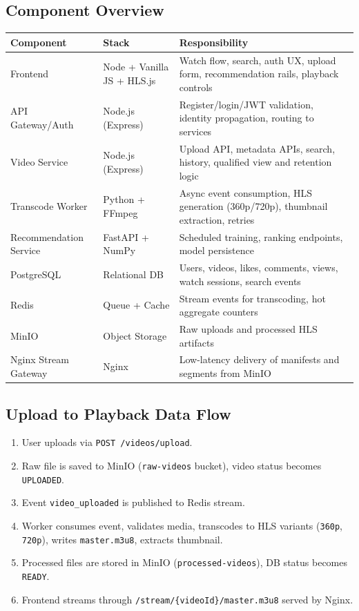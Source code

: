 \documentclass[11pt,a4paper]{article}
\begin{document}
\subsection{Component Overview}
\begin{table}[H]
\centering
\begin{tabularx}{\textwidth}{@{}p{3.0cm}p{2.3cm}X@{}}
\toprule
\textbf{Component} & \textbf{Stack} & \textbf{Responsibility} \\
\midrule
Frontend & Node + Vanilla JS + HLS.js & Watch flow, search, auth UX, upload form, recommendation rails, playback controls \\
API Gateway/Auth & Node.js (Express) & Register/login/JWT validation, identity propagation, routing to services \\
Video Service & Node.js (Express) & Upload API, metadata APIs, search, history, qualified view and retention logic \\
Transcode Worker & Python + FFmpeg & Async event consumption, HLS generation (360p/720p), thumbnail extraction, retries \\
Recommendation Service & FastAPI + NumPy & Scheduled training, ranking endpoints, model persistence \\
PostgreSQL & Relational DB & Users, videos, likes, comments, views, watch sessions, search events \\
Redis & Queue + Cache & Stream events for transcoding, hot aggregate counters \\
MinIO & Object Storage & Raw uploads and processed HLS artifacts \\
Nginx Stream Gateway & Nginx & Low-latency delivery of manifests and segments from MinIO \\
\bottomrule
\end{tabularx}
\end{table}

\subsection{Upload to Playback Data Flow}
\begin{enumerate}[leftmargin=1.4em]
  \item User uploads via \texttt{POST /videos/upload}.
  \item Raw file is saved to MinIO (\texttt{raw-videos} bucket), video status becomes \texttt{UPLOADED}.
  \item Event \texttt{video\_uploaded} is published to Redis stream.
  \item Worker consumes event, validates media, transcodes to HLS variants (\texttt{360p}, \texttt{720p}), writes \texttt{master.m3u8}, extracts thumbnail.
  \item Processed files are stored in MinIO (\texttt{processed-videos}), DB status becomes \texttt{READY}.
  \item Frontend streams through \texttt{/stream/\{videoId\}/master.m3u8} served by Nginx.
\end{enumerate}
\end{document}
